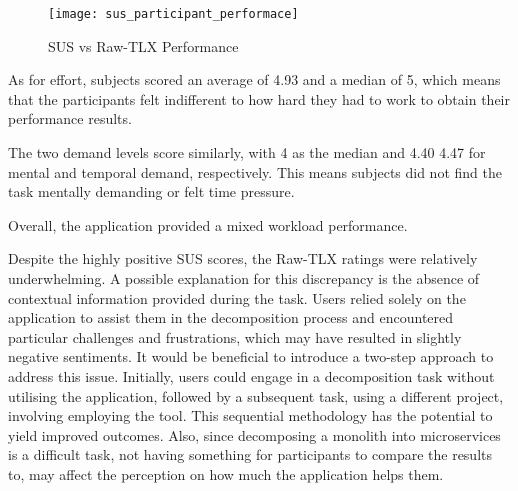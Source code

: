 \begin{figure*}[!htb]
  \centering
  \texttt{[image: sus\_participant\_performace]}
  \caption{SUS vs Raw-TLX Performance}
  \label{fig:sus_participant_performance}
\end{figure*}

As for effort, subjects scored an average of 4.93 and a median of 5, which
means that the participants felt indifferent to how hard they had to work to
obtain their performance results.

The two demand levels score similarly, with 4 as the median and 4.40 4.47 for
mental and temporal demand, respectively. This means subjects did not find the
task mentally demanding or felt time pressure.

Overall, the application provided a mixed workload performance.

Despite the highly positive SUS scores, the Raw-TLX ratings were relatively
underwhelming. A possible explanation for this discrepancy is the absence of
contextual information provided during the task. Users relied solely on the
application to assist them in the decomposition process and encountered
particular challenges and frustrations, which may have resulted in slightly
negative sentiments. It would be beneficial to introduce a two-step approach to
address this issue. Initially, users could engage in a decomposition task
without utilising the application, followed by a subsequent task, using a
different project, involving employing the tool. This sequential methodology
has the potential to yield improved outcomes. Also, since decomposing a
monolith into microservices is a difficult task, not having something for
participants to compare the results to, may affect the perception on how much
the application helps them.
